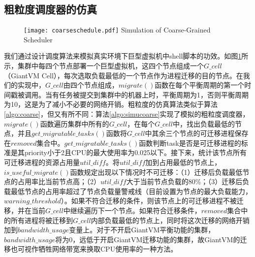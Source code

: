 \subsection{粗粒度调度器的仿真}
\begin{figure}[!htp]
  \centering
  \texttt{[image: coarseschedule.pdf]}
    {Simulation of Coarse-Grained Scheduler}
  \label{fig:simucoarse}
\end{figure}
我们通过设计调度算法来模拟真实环境下巨型虚拟机中shell脚本的功效。如图\ref{fig:simucoarse}所示，集群中每四个节点部署一个巨型虚拟机，这四个节点组成一个$G\_cell$（GiantVM Cell），每次选取负载最低的一个节点作为进程迁移的目的节点。在我们的实现中，$G\_cell$由四个节点组成，$migrate()$函数在每个平衡周期的第一个时间戳被调用。当有任务被提交到集群中的机器上时，平衡周期为1，否则平衡周期为10，这是为了减小不必要的网络开销。粗粒度的仿真算法类似于算法\ref{algo:coarse}，但又有所不同：算法\ref{algo:simucoarse}实现了模拟的粗粒度调度器，$migrate()$函数遍历集群中所有的$G\_cell$，在每个$G\_cell$中，找出负载最低的节点，并且$get\_migratable\_tasks()$函数将$G\_cell$中其余三个节点的可迁移进程保存在$removed$集合中。$get\_migratable\_tasks()$函数判断task是否是可迁移进程的标准是其priority小于2且CPU的最大使用率为0.025以下。接下来，统计该节点所有可迁移进程的资源占用量$util\_diff$。将$util\_diff$加到占用最低的节点上，$is\_useful\_migrate()$函数规定出现以下情况时不可迁移：（1）迁移后负载最低节点的占用率比当前节点高；（2）$util\_diff$大于当前节点负载的80\%；（3）迁移后负载最低节点的占用率超过了节点负载量警戒线（目前设置为节点的最大负载能力，$warning\_threshold$）。如果不符合迁移的条件，则该节点上的可迁移进程不被迁移，并在当前$G\_cell$中继续遍历下一个节点。如果符合迁移条件，$removed$集合中的所有进程将被迁移到$G\_cell$内部负载最低的节点上，同时将这次迁移的网络开销加到$bandwidth\_usage$变量上。对于不开启GiantVM平衡功能的集群，$bandwidth\_usage$将为0，远低于开启GiantVM迁移功能的集群，故GiantVM的迁移也可视作牺牲网络带宽来换取CPU使用率的一种方法。                                             


